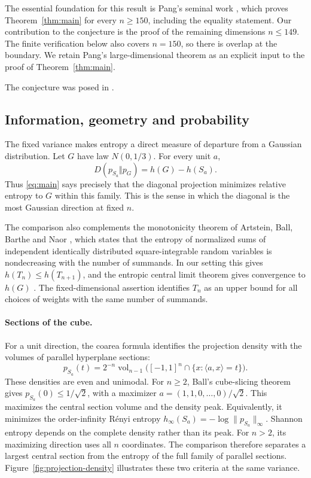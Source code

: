 \documentclass[11pt,a4paper]{article}
\theoremstyle{remark}\newtheorem{remark}[theorem]{Remark}
\begin{document}
The essential foundation for this result is Pang's seminal work
\cite{Pang}, which proves Theorem~\ref{thm:main} for every $n\ge150$,
including the equality statement. Our contribution to the conjecture
is the proof of the remaining dimensions $n\le149$. The finite
verification below also covers $n=150$, so there is overlap at the
boundary. We retain Pang's large-dimensional theorem as an explicit
input to the proof of Theorem~\ref{thm:main}.

The conjecture was posed in \cite[Question~9]{ENT2018}.
\subsection{Information, geometry and probability}
The fixed variance makes entropy a direct measure of departure from a
Gaussian distribution. Let $G$ have law $N(0,1/3)$. For every unit $a$,
\[
 D(p_{S_a}\Vert p_G)=h(G)-h(S_a).
\]
Thus \eqref{eq:main} says precisely that the diagonal projection
minimizes relative entropy to $G$ within this family. This is the sense
in which the diagonal is the most Gaussian direction at fixed $n$.

The comparison also complements the monotonicity theorem of Artstein,
Ball, Barthe and Naor \cite{ABBN2004}, which states that the entropy of
normalized sums of independent identically distributed square-integrable
random variables is nondecreasing with the number of summands. In our
setting this gives $h(T_n)\le h(T_{n+1})$, and the entropic central limit
theorem gives convergence to $h(G)$ \cite{Barron1986}.
The fixed-dimensional assertion identifies $T_n$ as an upper bound for
all choices of weights with the same number of summands.

\paragraph{Sections of the cube.}
For a unit direction, the coarea formula identifies the projection
density with the volumes of parallel hyperplane sections:
\[
 p_{S_a}(t)=2^{-n}\operatorname{vol}_{n-1}
 \bigl([-1,1]^n\cap\{x:\langle a,x\rangle=t\}\bigr).
\]
These densities are even and unimodal. For $n\ge2$, Ball's cube-slicing theorem
\cite{Ball1986} gives $p_{S_a}(0)\le1/\sqrt2$, with a maximizer
$a=(1,1,0,\ldots,0)/\sqrt2$. This maximizes the central section volume
and the density peak. Equivalently, it minimizes the order-infinity
R\'enyi entropy $h_\infty(S_a)=-\log\|p_{S_a}\|_\infty$.
Shannon entropy depends on the complete density rather than its peak.
For $n>2$, its maximizing direction uses all $n$ coordinates. The
comparison therefore separates a largest central section from the
entropy of the full family of parallel sections. Figure~\ref{fig:projection-density}
illustrates these two criteria at the same variance.
\end{document}

